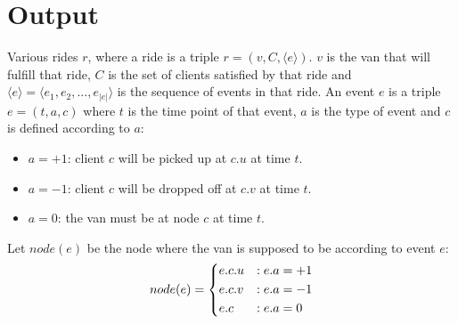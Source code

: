 \section{Output}
Various rides $r$, where a ride is a triple $r=(v, C, \langle e \rangle)$. $v$ is the van that will fulfill that ride, $C$ is the set of clients satisfied by that ride and $\langle e \rangle = \langle e_1, e_2,...,e_{|e|} \rangle$ is the sequence of events in that ride. An event $e$ is a triple $e=(t, a, c)$ where $t$ is the time point of that event, $a$ is the type of event and $c$ is defined according to $a$:
\begin{itemize}
    \item $a=+1$: client $c$ will be picked up at $c.u$ at time $t$.
    \item $a=-1$: client $c$ will be dropped off at $c.v$ at time $t$.
    \item $a=0$: the van must be at node $c$ at time $t$.
\end{itemize}
Let $node(e)$ be the node where the van is supposed to be according to event $e$:
\begin{equation*}
    node(e)=\begin{dcases}
        e.c.u & : e.a = +1\\
        e.c.v & : e.a = -1\\
        e.c   & : e.a = 0
    \end{dcases}
\end{equation*}
